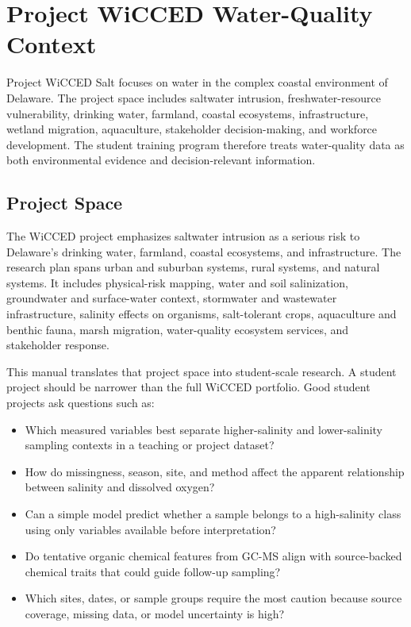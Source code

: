 \chapter{Project WiCCED Water-Quality Context}

Project WiCCED Salt focuses on water in the complex coastal environment of Delaware. The project space includes saltwater intrusion, freshwater-resource vulnerability, drinking water, farmland, coastal ecosystems, infrastructure, wetland migration, aquaculture, stakeholder decision-making, and workforce development. The student training program therefore treats water-quality data as both environmental evidence and decision-relevant information.

\section{Project Space}

The WiCCED project emphasizes saltwater intrusion as a serious risk to Delaware's drinking water, farmland, coastal ecosystems, and infrastructure. The research plan spans urban and suburban systems, rural systems, and natural systems. It includes physical-risk mapping, water and soil salinization, groundwater and surface-water context, stormwater and wastewater infrastructure, salinity effects on organisms, salt-tolerant crops, aquaculture and benthic fauna, marsh migration, water-quality ecosystem services, and stakeholder response.

This manual translates that project space into student-scale research. A student project should be narrower than the full WiCCED portfolio. Good student projects ask questions such as:
\begin{itemize}
  \item Which measured variables best separate higher-salinity and lower-salinity sampling contexts in a teaching or project dataset?
  \item How do missingness, season, site, and method affect the apparent relationship between salinity and dissolved oxygen?
  \item Can a simple model predict whether a sample belongs to a high-salinity class using only variables available before interpretation?
  \item Do tentative organic chemical features from GC-MS align with source-backed chemical traits that could guide follow-up sampling?
  \item Which sites, dates, or sample groups require the most caution because source coverage, missing data, or model uncertainty is high?
\end{itemize}


